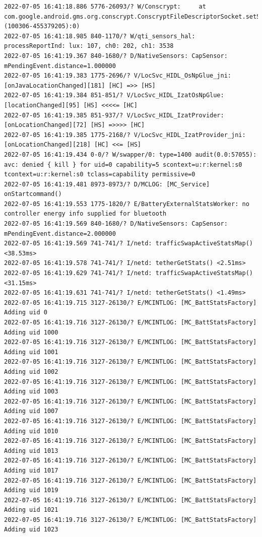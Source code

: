 \documentclass[a4paper,12pt]{book}
\begin{document}
\begin{lstlisting}
2022-07-05 16:41:18.886 5776-26093/? W/Conscrypt:     at com.google.android.gms.org.conscrypt.ConscryptFileDescriptorSocket.setSoWriteTimeout(:com.google.android.gms@222413026@22.24.13 (100306-455379205):0)
2022-07-05 16:41:18.985 840-1170/? W/qti_sensors_hal: processReportInd: lux: 107, ch0: 202, ch1: 3538
2022-07-05 16:41:19.367 840-1680/? D/NativeSensors: CapSensor:  mPendingEvent.distance=1.000000
2022-07-05 16:41:19.383 1775-2696/? V/LocSvc_HIDL_OsNpGlue_jni: [onJavaLocationChanged][181] [HC] =>> [HS]
2022-07-05 16:41:19.384 851-851/? V/LocSvc_HIDL_IzatOsNpGlue: [locationChanged][95] [HS] <<<<= [HC]
2022-07-05 16:41:19.385 851-937/? V/LocSvc_HIDL_IzatProvider: [onLocationChanged][72] [HS] =>>>> [HC]
2022-07-05 16:41:19.385 1775-2168/? V/LocSvc_HIDL_IzatProvider_jni: [onLocationChanged][218] [HC] <<= [HS]
2022-07-05 16:41:19.434 0-0/? W/swapper/0: type=1400 audit(0.0:57055): avc: denied { kill } for uid=0 capability=5 scontext=u:r:kernel:s0 tcontext=u:r:kernel:s0 tclass=capability permissive=0
2022-07-05 16:41:19.481 8973-8973/? D/MCLOG: [MC_Service] onStartcommand()
2022-07-05 16:41:19.553 1775-1820/? E/BatteryExternalStatsWorker: no controller energy info supplied for bluetooth
2022-07-05 16:41:19.569 840-1680/? D/NativeSensors: CapSensor:  mPendingEvent.distance=2.000000
2022-07-05 16:41:19.569 741-741/? I/netd: trafficSwapActiveStatsMap() <38.53ms>
2022-07-05 16:41:19.578 741-741/? I/netd: tetherGetStats() <2.51ms>
2022-07-05 16:41:19.629 741-741/? I/netd: trafficSwapActiveStatsMap() <31.15ms>
2022-07-05 16:41:19.631 741-741/? I/netd: tetherGetStats() <1.49ms>
2022-07-05 16:41:19.715 3127-26130/? E/MCINTLOG: [MC_BattStatsFactory] Adding uid 0
2022-07-05 16:41:19.716 3127-26130/? E/MCINTLOG: [MC_BattStatsFactory] Adding uid 1000
2022-07-05 16:41:19.716 3127-26130/? E/MCINTLOG: [MC_BattStatsFactory] Adding uid 1001
2022-07-05 16:41:19.716 3127-26130/? E/MCINTLOG: [MC_BattStatsFactory] Adding uid 1002
2022-07-05 16:41:19.716 3127-26130/? E/MCINTLOG: [MC_BattStatsFactory] Adding uid 1003
2022-07-05 16:41:19.716 3127-26130/? E/MCINTLOG: [MC_BattStatsFactory] Adding uid 1007
2022-07-05 16:41:19.716 3127-26130/? E/MCINTLOG: [MC_BattStatsFactory] Adding uid 1010
2022-07-05 16:41:19.716 3127-26130/? E/MCINTLOG: [MC_BattStatsFactory] Adding uid 1013
2022-07-05 16:41:19.716 3127-26130/? E/MCINTLOG: [MC_BattStatsFactory] Adding uid 1017
2022-07-05 16:41:19.716 3127-26130/? E/MCINTLOG: [MC_BattStatsFactory] Adding uid 1019
2022-07-05 16:41:19.716 3127-26130/? E/MCINTLOG: [MC_BattStatsFactory] Adding uid 1021
2022-07-05 16:41:19.716 3127-26130/? E/MCINTLOG: [MC_BattStatsFactory] Adding uid 1023

\end{lstlisting}
\end{document}
